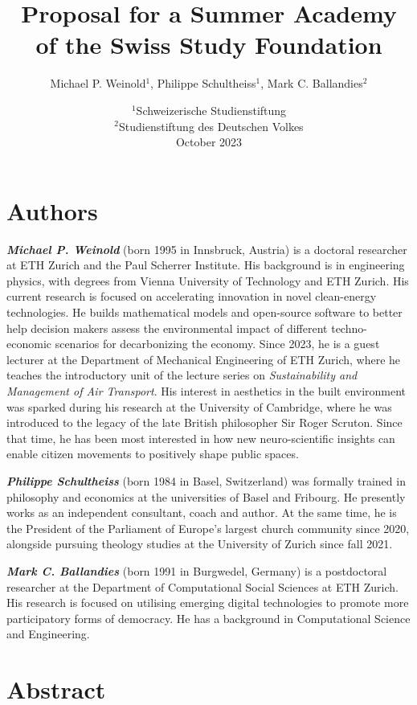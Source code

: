 \documentclass{article}
\title{Proposal for a Summer Academy \protect\\ of the Swiss Study Foundation}
\author{Michael P. Weinold$^1$, Philippe Schultheiss$^1$, Mark C. Ballandies$^2$}
\date{
    $^1$Schweizerische Studienstiftung \\
    $^2$Studienstiftung des Deutschen Volkes \\[3mm]
    October 2023
}
\begin{document}
\maketitle

\section*{\centering Authors}

\textbf{\textit{Michael P. Weinold}} (born 1995 in Innsbruck, Austria) is a doctoral researcher at ETH Zurich and the Paul Scherrer Institute. His background is in engineering physics, with degrees from Vienna University of Technology and ETH Zurich. His current research is focused on accelerating innovation in novel clean-energy technologies. He builds mathematical models and open-source software to better help decision makers assess the environmental impact of different techno-economic scenarios for decarbonizing the economy. Since 2023, he is a guest lecturer at the Department of Mechanical Engineering of ETH Zurich, where he teaches the introductory unit of the lecture series on \textit{Sustainability and Management of Air Transport}. His interest in aesthetics in the built environment was sparked during his research at the University of Cambridge, where he was introduced to the legacy of the late British philosopher Sir Roger Scruton. Since that time, he has been most interested in how new neuro-scientific insights can enable citizen movements to positively shape public spaces.

\textbf{\textit{Philippe Schultheiss}} (born 1984 in Basel, Switzerland) was formally trained in philosophy and economics at the universities of Basel and Fribourg. He presently works as an independent consultant, coach and author. At the same time, he is the President of the Parliament of Europe's largest church community since 2020, alongside pursuing theology studies at the University of Zurich since fall 2021. 

\textbf{\textit{Mark C. Ballandies}} (born 1991 in Burgwedel, Germany) is a postdoctoral researcher at the Department of Computational Social Sciences at ETH Zurich. His research is focused on utilising emerging digital technologies to promote more participatory forms of democracy. He has a background in Computational Science and Engineering.


\clearpage
\tableofcontents

\section{\centering Abstract}
\end{document}
